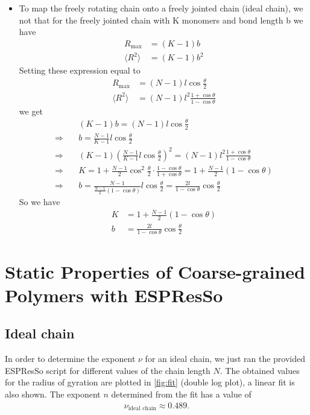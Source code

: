 \documentclass[a4paper,10pt,bibtotoc]{scrartcl}
\begin{document}
\begin{itemize}
\item To map the freely rotating chain onto a freely jointed chain (ideal chain), we not that for the freely jointed chain with K monomers and bond length b we have
\begin{align}
R_\mathrm{max} &= \left(K-1\right) b\\
\langle R^2\rangle &= \left(K-1\right) b^2
\end{align}
Setting these expression equal to  
\begin{align}
R_\mathrm{max} &= \left(N-1\right) l\cos\frac{\theta}{2}\\
\langle R^2\rangle &= \left(N-1\right)l^2\frac{1+\cos\theta}{1-\cos\theta}
\end{align}
we get
\begin{align}
&\left(K-1\right) b = \left(N-1\right) l\cos\frac{\theta}{2}\\
\Rightarrow\quad& b =  \frac{N-1}{K-1} l\cos\frac{\theta}{2}\\
\Rightarrow\quad& \left(K-1\right) \left(\frac{N-1}{K-1} l\cos\frac{\theta}{2}\right)^2 = \left(N-1\right)l^2\frac{1+\cos\theta}{1-\cos\theta}\\
\Rightarrow\quad& K = 1 + \frac{N-1}{2} \cos^2\frac{\theta}{2}\cdot \frac{1-\cos\theta}{1+\cos\theta} = 1 + \frac{N-1}{2} \left(1-\cos\theta\right)\\
\Rightarrow\quad& b =  \frac{N-1}{\frac{N-1}{2} \left(1-\cos\theta\right)} l\cos\frac{\theta}{2} = \frac{2l}{1-\cos\theta} \cos\frac{\theta}{2}
\end{align}
So we have
\begin{align}
K & = 1 + \frac{N-1}{2} \left(1-\cos\theta\right)\\
b &=  \frac{2l}{1-\cos\theta} \cos\frac{\theta}{2}
\end{align}


\end{itemize}

\section{Static Properties of Coarse-grained Polymers with ESPResSo}
\subsection{Ideal chain}
In order to determine the exponent $\nu$ for an ideal chain, we just ran the provided ESPResSo script for different values of the chain length $N$. The obtained values for the radius of gyration are plotted in \autoref{fig:fit} (double log plot), a linear fit is also shown. The exponent $n$ determined from the fit has a value of 
\begin{align}
\nu_\text{ideal chain}\approx 0.489.
\end{align}
\end{document}
